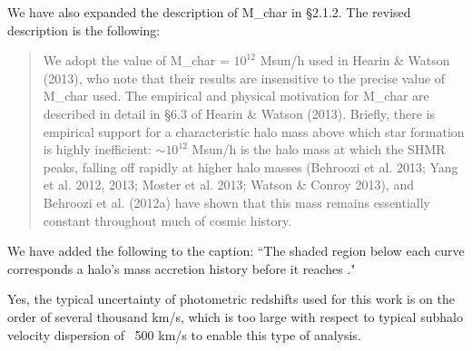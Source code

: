 \documentclass[12pt,preprint]{aastex}
\begin{document}
We have also expanded the description of M\_char in \S2.1.2. The revised description is the following:

\begin{quotation}
We adopt the value of M\_char =  $10^{12}$ Msun/h used in Hearin \& Watson (2013), who note that their results are insensitive to the precise value of M\_char used. The empirical and physical motivation for M\_char are described in detail in \S6.3 of Hearin \& Watson (2013). Briefly, there is empirical support for a characteristic halo mass above which star formation is highly inefficient:  $\sim10^{12}$ Msun/h
is the halo mass at which the SHMR peaks, falling off rapidly at higher halo masses (Behroozi et al. 2013; Yang et al. 2012, 2013; Moster et al. 2013; Watson \& Conroy 2013), and Behroozi et al. (2012a) have shown that this mass remains essentially constant throughout much of cosmic history.
\end{quotation}

\noindent {}

We have added the following to the caption: ``The shaded region below each curve corresponds a halo's mass accretion history before it reaches \zstarve."

\noindent {}

Yes, the typical uncertainty of photometric redshifts used for this work is on the order of several thousand km/s, which is too large with respect to typical subhalo velocity dispersion of ~500 km/s to enable this type of analysis.

\noindent {}
\end{document}

